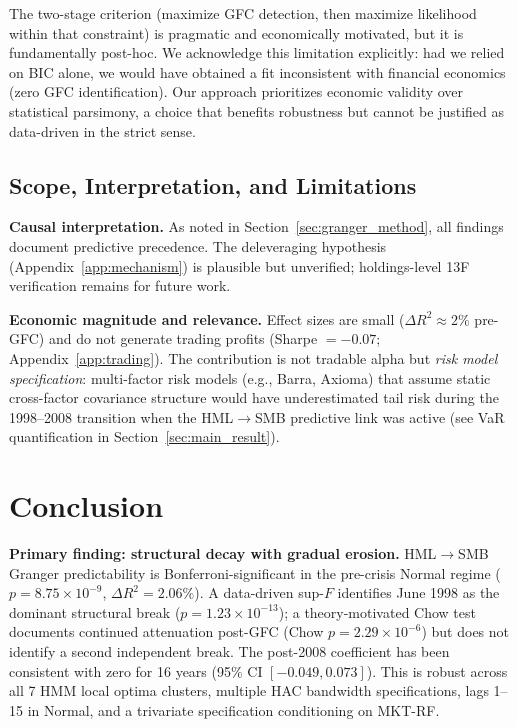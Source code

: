 \documentclass[sigconf,anonymous]{acmart}
\begin{document}
The two-stage criterion (maximize GFC detection, then maximize likelihood within that constraint)
is pragmatic and economically motivated, but it is fundamentally post-hoc. We acknowledge this
limitation explicitly: had we relied on BIC alone, we would have obtained a fit inconsistent
with financial economics (zero GFC identification). Our approach prioritizes economic validity
over statistical parsimony, a choice that benefits robustness but cannot be justified as data-driven
in the strict sense.

\subsection{Scope, Interpretation, and Limitations}
\label{sec:limitations}

\textbf{Causal interpretation.}
As noted in Section~\ref{sec:granger_method}, all findings document predictive
precedence. The deleveraging hypothesis (Appendix~\ref{app:mechanism}) is plausible but
unverified; holdings-level 13F verification remains for future work.

\textbf{Economic magnitude and relevance.}
Effect sizes are small ($\Delta R^2 \approx 2\%$ pre-GFC) and do not generate
trading profits (Sharpe $= -0.07$; Appendix~\ref{app:trading}).
The contribution is not tradable alpha but \emph{risk model specification}:
multi-factor risk models (e.g., Barra, Axioma) that assume static cross-factor
covariance structure would have underestimated tail risk during the
1998--2008 transition when the HML$\to$SMB predictive link was active
(see VaR quantification in Section~\ref{sec:main_result}).

\section{Conclusion}

\textbf{Primary finding: structural decay with gradual erosion.}
HML$\to$SMB Granger predictability is Bonferroni-significant in the
pre-crisis Normal regime ($p = 8.75 \times 10^{-9}$, $\Delta R^2 = 2.06\%$).
A data-driven sup-$F$ identifies June 1998 as the dominant structural break
($p = 1.23 \times 10^{-13}$); a theory-motivated Chow test documents
continued attenuation post-GFC (Chow $p = 2.29 \times 10^{-6}$) but does
not identify a second independent break. The post-2008 coefficient has been
consistent with zero for 16 years (95\% CI $[-0.049, 0.073]$).
This is robust across all 7 HMM local optima clusters, multiple HAC bandwidth
specifications, lags 1--15 in Normal, and a trivariate specification conditioning on MKT-RF.
\end{document}
